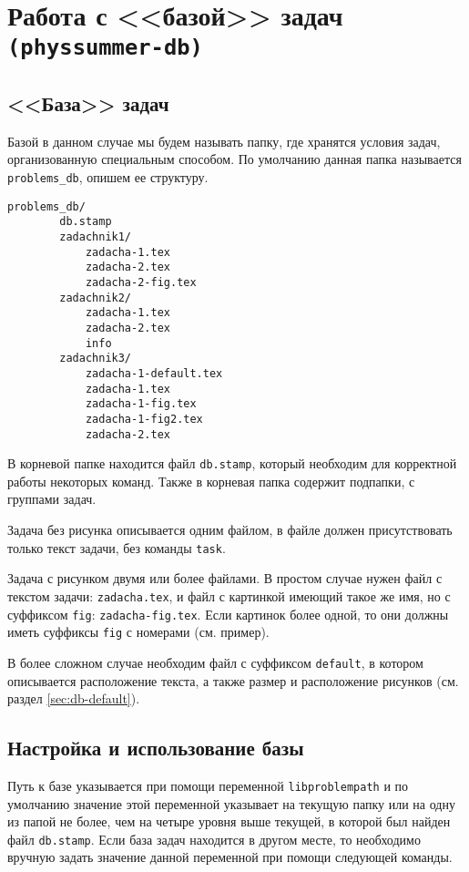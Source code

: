 \section{Работа с <<базой>> задач \texttt{(physsummer-db)}}
\label{sec:db}

\subsection{<<База>> задач}
\label{sec:db-description}

Базой в данном случае мы будем называть папку, где хранятся условия задач, организованную специальным
способом. По умолчанию данная папка называется \texttt{problems\_db}, опишем ее структуру.

\begin{lstlisting}[gobble = 3]
    problems_db/
        db.stamp
        zadachnik1/
            zadacha-1.tex
            zadacha-2.tex
            zadacha-2-fig.tex
        zadachnik2/
            zadacha-1.tex
            zadacha-2.tex
            info
        zadachnik3/
            zadacha-1-default.tex
            zadacha-1.tex
            zadacha-1-fig.tex
            zadacha-1-fig2.tex
            zadacha-2.tex
\end{lstlisting}

В корневой папке находится файл \texttt{db.stamp}, который необходим для корректной работы некоторых
команд. Также в корневая папка содержит подпапки, с группами задач.

Задача без рисунка описывается одним файлом, в файле должен присутствовать только текст задачи, без
команды \texttt{task}.

Задача с рисунком двумя или более файлами. В простом случае нужен файл с текстом задачи:
\texttt{zadacha.tex}, и файл с картинкой имеющий такое же имя, но с суффиксом \texttt{fig}:
\texttt{zadacha-fig.tex}. Если картинок более одной, то они должны иметь суффиксы \texttt{fig} с номерами
(см. пример).

В более сложном случае необходим файл с суффиксом \texttt{default}, в котором описывается расположение
текста, а также размер и расположение рисунков (см. раздел \ref{sec:db-default}).

\subsection{Настройка и использование базы}

Путь к базе указывается при помощи переменной \texttt{libproblempath} и по умолчанию значение этой
переменной указывает на текущую папку или на одну из папой не более, чем на четыре уровня выше текущей, в
которой был найден файл \texttt{db.stamp}. Если база задач находится в другом месте, то необходимо
вручную задать значение данной переменной при помощи следующей команды.

